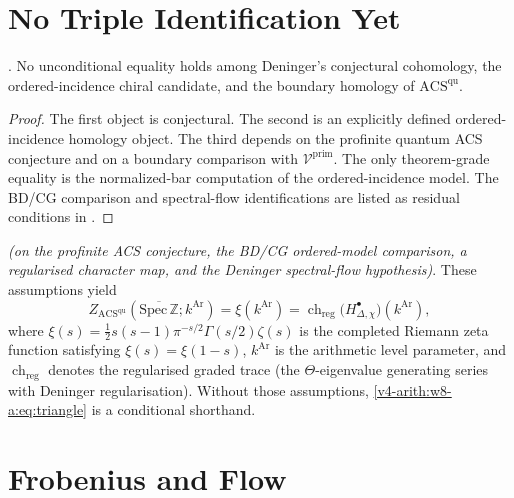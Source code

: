 \section{No Triple Identification Yet}
\label{v4-arith:w8-a:integration}
\label{v4-arith:w8-a:ah:identification}

\begin{theorem}
\label{v4-arith:w8-a:thm:triple-id}
\ClaimStatusProvedHere. No unconditional equality holds among
Deninger's conjectural cohomology, the ordered-incidence chiral
candidate, and the boundary homology of \(\mathrm{ACS}^{\mathrm{qu}}\).
\end{theorem}

\begin{proof}
The first object is conjectural. The second is an explicitly defined
ordered-incidence homology object. The third depends on the profinite
quantum ACS conjecture and on a boundary comparison with
\(\mathcal V^{\mathrm{prim}}\). The only theorem-grade equality is the
normalized-bar computation of the ordered-incidence model. The BD/CG
comparison and spectral-flow identifications are listed as residual
conditions in .
\end{proof}

\begin{corollary}
\label{v4-arith:w8-a:cor:triangle}
\ClaimStatusConditional \emph{(on the profinite ACS conjecture, the
BD/CG ordered-model comparison, a regularised character map, and the
Deninger spectral-flow hypothesis)}. These assumptions yield
\begin{equation}
\label{v4-arith:w8-a:eq:triangle}
Z_{\mathrm{ACS}^{\mathrm{qu}}}
(\overline{\mathrm{Spec}\,\mathbb Z};k^{\mathrm{Ar}})
=
\xi(k^{\mathrm{Ar}})
=
\operatorname{ch}_{\mathrm{reg}}
\bigl(H^\bullet_{\Delta,\chi}\bigr)(k^{\mathrm{Ar}}),
\end{equation}
where \(\xi(s) = \tfrac{1}{2}s(s-1)\pi^{-s/2}\Gamma(s/2)\zeta(s)\)
is the completed Riemann zeta function satisfying \(\xi(s)=\xi(1-s)\),
\(k^{\mathrm{Ar}}\) is the arithmetic level parameter, and
\(\operatorname{ch}_{\mathrm{reg}}\) denotes the regularised graded
trace (the \(\Theta\)-eigenvalue generating series with Deninger
regularisation). Without those assumptions,
\eqref{v4-arith:w8-a:eq:triangle} is a conditional shorthand.
\end{corollary}

\section{Frobenius and Flow}
\label{v4-arith:w8-a:global-F}

